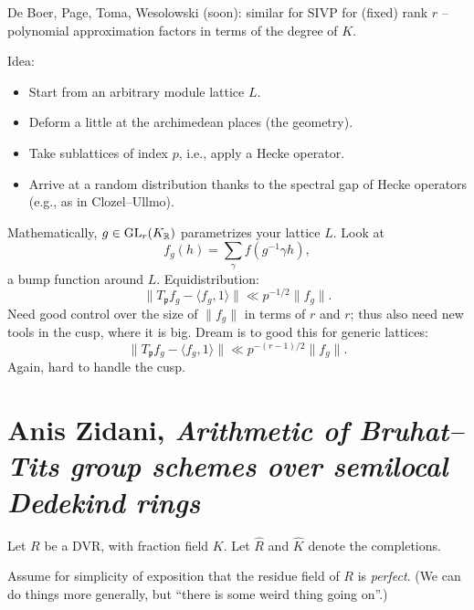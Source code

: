 \documentclass[reqno]{amsart} 
\numberwithin{theorem}{section}
\numberwithin{equation}{section}
\begin{document}
De Boer, Page, Toma, Wesolowski (soon): similar for SIVP for (fixed) rank $r$ -- polynomial approximation factors in terms of the degree of $K$.

Idea:
\begin{itemize}
\item Start from an arbitrary module lattice $L$.  
\item Deform a little at the archimedean places (the geometry).
\item Take sublattices of index $p$, i.e., apply a Hecke operator.
\item Arrive at a random distribution thanks to the spectral gap of Hecke operators (e.g., as in Clozel--Ullmo).
\end{itemize}

Mathematically, $g \in \operatorname{GL}_r(K_{\mathbb{R}})$ parametrizes your lattice $L$.  Look at
\begin{equation*}
  f_g(h) = \sum_{\gamma} f(g^{-1} \gamma h),
\end{equation*}
a bump function around $L$.  Equidistribution:
\begin{equation*}
  \lVert T_{\mathfrak{p}} f_g - \langle f_g, 1 \rangle \rVert \ll p^{-1/2} \lVert f_g \rVert.
\end{equation*}
Need good control over the size of $\lVert f_g \rVert$ in terms of $r$ and $r$; thus also need new tools in the cusp, where it is big.  Dream is to good this for generic lattices:
\begin{equation*}
  \lVert T_{\mathfrak{p}} f_g - \langle f_g, 1 \rangle \rVert \ll p^{-(r-1)/2} \lVert f_g \rVert.
\end{equation*}
Again, hard to handle the cusp.

\section{Anis Zidani, \emph{Arithmetic of Bruhat--Tits group schemes over semilocal Dedekind rings}}

Let $R$ be a DVR, with fraction field $K$.  Let $\hat{R}$ and $\hat{K}$ denote the completions.

Assume for simplicity of exposition that the residue field of $R$ is \emph{perfect}.  (We can do things more generally, but ``there is some weird thing going on''.)
\end{document}
